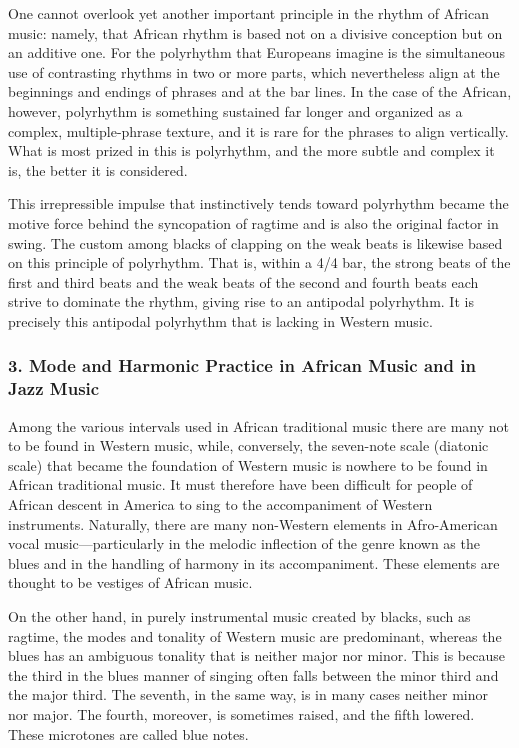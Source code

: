 One cannot overlook yet another important principle in the rhythm of African music: namely, that African rhythm is based not on a divisive conception but on an additive one. For the polyrhythm that Europeans imagine is the simultaneous use of contrasting rhythms in two or more parts, which nevertheless align at the beginnings and endings of phrases and at the bar lines. In the case of the African, however, polyrhythm is something sustained far longer and organized as a complex, multiple-phrase texture, and it is rare for the phrases to align vertically. What is most prized in this is polyrhythm, and the more subtle and complex it is, the better it is considered.

This irrepressible impulse that instinctively tends toward polyrhythm became the motive force behind the syncopation of ragtime and is also the original factor in swing. The custom among blacks of clapping on the weak beats is likewise based on this principle of polyrhythm. That is, within a 4/4 bar, the strong beats of the first and third beats and the weak beats of the second and fourth beats each strive to dominate the rhythm, giving rise to an antipodal polyrhythm. It is precisely this antipodal polyrhythm that is lacking in Western music.

\subsubsection{3. Mode and Harmonic Practice in African Music and in Jazz Music}

Among the various intervals used in African traditional music there are many not to be found in Western music, while, conversely, the seven-note scale (diatonic scale) that became the foundation of Western music is nowhere to be found in African traditional music. It must therefore have been difficult for people of African descent in America to sing to the accompaniment of Western instruments. Naturally, there are many non-Western elements in Afro-American vocal music—particularly in the melodic inflection of the genre known as the blues and in the handling of harmony in its accompaniment. These elements are thought to be vestiges of African music.

On the other hand, in purely instrumental music created by blacks, such as ragtime, the modes and tonality of Western music are predominant, whereas the blues has an ambiguous tonality that is neither major nor minor. This is because the third in the blues manner of singing often falls between the minor third and the major third. The seventh, in the same way, is in many cases neither minor nor major. The fourth, moreover, is sometimes raised, and the fifth lowered. These microtones are called blue notes.

